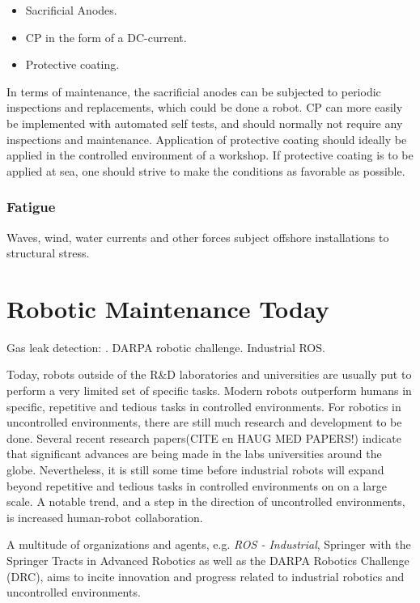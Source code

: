 \begin{itemize}
	\item Sacrificial Anodes.
	\item \ac{CP} in the form of a DC-current.
	\item Protective coating.
\end{itemize} 

In terms of maintenance, the sacrificial anodes can be subjected to periodic inspections and replacements, which could be done a robot. \ac{CP} can more easily be implemented with automated self tests, and should normally not require any inspections and maintenance\cite{ElReedy2012383}. Application of protective coating should ideally be applied in the controlled environment of a workshop. If protective coating is to be applied at sea, one should strive to make the conditions as favorable as possible. 

\subsubsection{Fatigue}

Waves, wind, water currents and other forces subject offshore installations to structural stress.

\section{Robotic Maintenance Today}

Gas leak detection: \cite{FSR2014_gas_leak}. DARPA robotic challenge. Industrial ROS.

Today, robots outside of the R\&D laboratories and universities are usually put to perform a very limited set of specific tasks. Modern robots outperform humans in specific, repetitive and tedious tasks in controlled environments. For robotics in uncontrolled environments, there are still much research and development to be done. Several recent research papers(CITE en HAUG MED PAPERS!) indicate that significant advances are being made in the labs universities around the globe. Nevertheless, it is still some time before industrial robots will expand beyond repetitive and tedious tasks in controlled environments on on a large scale\cite{ifr_statistics}. A notable trend, and a step in the direction of uncontrolled environments, is increased human-robot collaboration\cite{cobotsEurope}.

A multitude of organizations and agents, e.g. \textit{ROS - Industrial}\cite{ROS_industrial}, Springer with the Springer Tracts in Advanced Robotics as well as the DARPA Robotics Challenge (DRC)\cite{DRC}, aims to incite innovation and progress related to industrial robotics and uncontrolled environments. 

